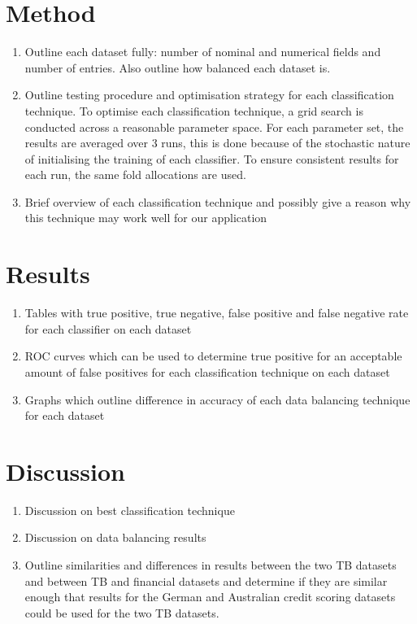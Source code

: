\documentclass{sig-alternate-05-2015}
\begin{document}
\section{Method}
\begin{enumerate}
	\item Outline each dataset fully: number of nominal and numerical fields and number of entries. Also outline how balanced each dataset is.
	\item Outline testing procedure and optimisation strategy for each classification technique. To optimise each classification technique, a grid search is conducted across a reasonable parameter space. For each parameter set, the results are averaged over 3 runs, this is done because of the stochastic nature of initialising the training of each classifier. To ensure consistent results for each run, the same fold allocations are used.
	\item Brief overview of each classification technique and possibly give a reason why this technique may work well for our application
\end{enumerate}

\section{Results}
\begin{enumerate}
	\item Tables with true positive, true negative, false positive and false negative rate for each classifier on each dataset
	\item ROC curves which can be used to determine true positive for an acceptable amount of false positives for each classification technique on each dataset
	\item Graphs which outline difference in accuracy of each data balancing technique for each dataset
\end{enumerate}

\section{Discussion}
\begin{enumerate}
	\item Discussion on best classification technique
	\item Discussion on data balancing results
	\item Outline similarities and differences in results between the two TB datasets and between TB and financial datasets and determine if they are similar enough that results for the German and Australian credit scoring datasets could be used for the two TB datasets.
	
\end{enumerate}
\end{document}
